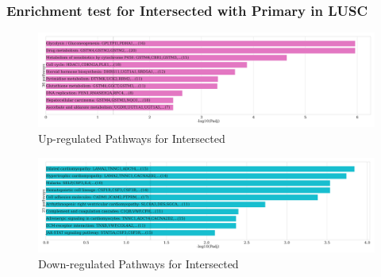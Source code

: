 \documentclass{beamer}
\begin{document}
    \begin{frame}
        \frametitle{Enrichment test for Intersected with Primary in LUSC}

        \begin{figure}
            \includegraphics[width=0.8 \linewidth]{figures/DEG/Enrichment/STAR.SQC-Primary.Both.Up.KEGG.pdf}
            \caption{Up-regulated Pathways for Intersected}
        \end{figure}

        \begin{figure}
            \includegraphics[width=0.8 \linewidth]{figures/DEG/Enrichment/STAR.SQC-Primary.Both.Down.KEGG.pdf}
            \caption{Down-regulated Pathways for Intersected}
        \end{figure}
    \end{frame}
\end{document}

